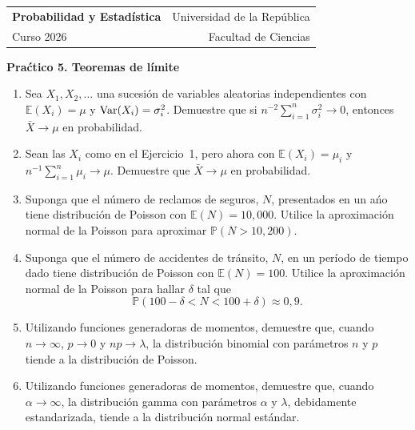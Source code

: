 \documentclass[12pt]{article}
\newcommand{\EE}{\mathbb{E}}
\newcommand{\PP}{\mathbb{P}}
\newcommand{\var}{{\rm Var}}
\begin{document}
\begin{center}
\begin{tabular}{@{}l r@{}}
\textbf{Probabilidad y Estad\'istica} & Universidad de la Rep\'ublica\\
Curso 2026 & Facultad de Ciencias\\
\end{tabular}
\end{center}

\vspace{1.2em}

\begin{center}
{\Large\bfseries Pra\'ctico 5. Teoremas de l\'imite}
\end{center}

\vspace{1.2em}

\begin{enumerate}

\item Sea $X_1, X_2, \dots$ una sucesi\'on de variables aleatorias independientes con $\EE(X_i)=\mu$ y $\var(X_i)=\sigma_i^2$. Demuestre que si $n^{-2}\sum_{i=1}^{n}\sigma_i^2 \to 0$, entonces $\bar{X}\to\mu$ en probabilidad.

\item Sean las $X_i$ como en el Ejercicio~1, pero ahora con $\EE(X_i)=\mu_i$ y $n^{-1}\sum_{i=1}^{n}\mu_i \to \mu$. Demuestre que $\bar{X}\to\mu$ en probabilidad.

\item Suponga que el n\'umero de reclamos de seguros, $N$, presentados en un a\'no tiene distribuci\'on de Poisson con $\EE(N)=10{,}000$. Utilice la aproximaci\'on normal de la Poisson para aproximar $\PP(N>10{,}200)$.

\item Suponga que el n\'umero de accidentes de tr\'ansito, $N$, en un per\'iodo de tiempo dado tiene distribuci\'on de Poisson con $\EE(N)=100$. Utilice la aproximaci\'on normal de la Poisson para hallar $\delta$ tal que
\[\PP(100-\delta<N<100+\delta)\approx 0{,}9.\]

\item Utilizando funciones generadoras de momentos, demuestre que, cuando $n\to\infty$, $p\to 0$ y $np\to\lambda$, la distribuci\'on binomial con par\'ametros $n$ y $p$ tiende a la distribuci\'on de Poisson.

\item Utilizando funciones generadoras de momentos, demuestre que, cuando $\alpha\to\infty$, la distribuci\'on gamma con par\'ametros $\alpha$ y $\lambda$, debidamente estandarizada, tiende a la distribuci\'on normal est\'andar.


\end{enumerate}
\end{document}
